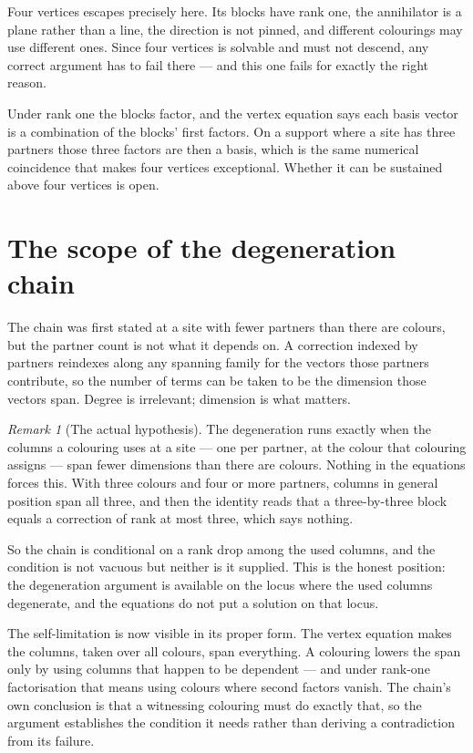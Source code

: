 \documentclass[11pt]{article}
\theoremstyle{definition}
\theoremstyle{remark}
\newtheorem{remark}[theorem]{Remark}
\begin{document}
Four vertices escapes precisely here. Its blocks have rank one, the annihilator is a
plane rather than a line, the direction is not pinned, and different colourings may use
different ones. Since four vertices is solvable and must not descend, any correct argument
has to fail there --- and this one fails for exactly the right reason.

Under rank one the blocks factor, and the vertex equation says each basis vector is a
combination of the blocks' first factors. On a support where a site has three partners
those three factors are then a basis, which is the same numerical coincidence that makes
four vertices exceptional. Whether it can be sustained above four vertices is open.

\section{The scope of the degeneration chain}\label{sec:scope}

The chain was first stated at a site with fewer partners than there are colours, but the
partner count is not what it depends on. A correction indexed by partners reindexes along
any spanning family for the vectors those partners contribute, so the number of terms can
be taken to be the dimension those vectors span. Degree is irrelevant; dimension is what
matters.

\begin{remark}[The actual hypothesis]
The degeneration runs exactly when the columns a colouring uses at a site --- one per
partner, at the colour that colouring assigns --- span fewer dimensions than there are
colours. Nothing in the equations forces this. With three colours and four or more
partners, columns in general position span all three, and then the identity reads that a
three-by-three block equals a correction of rank at most three, which says nothing.
\end{remark}

So the chain is conditional on a rank drop among the used columns, and the condition is
not vacuous but neither is it supplied. This is the honest position: the degeneration
argument is available on the locus where the used columns degenerate, and the equations do
not put a solution on that locus.

The self-limitation is now visible in its proper form. The vertex equation makes the
columns, taken over all colours, span everything. A colouring lowers the span only by
using columns that happen to be dependent --- and under rank-one factorisation that means
using colours where second factors vanish. The chain's own conclusion is that a witnessing
colouring must do exactly that, so the argument establishes the condition it needs rather
than deriving a contradiction from its failure.
\end{document}
